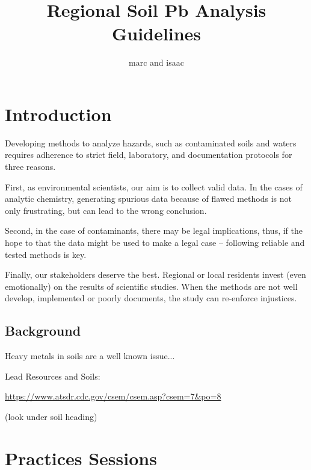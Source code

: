 \documentclass{article}\usepackage[]{graphicx}\usepackage[]{color}
\title{Regional Soil Pb Analysis Guidelines}
\author{marc and isaac}
\begin{document}
\maketitle

\section{Introduction}

Developing methods to analyze hazards, such as contaminated soils and waters requires adherence to strict field, laboratory, and documentation protocols for three reasons. 

First, as environmental scientists, our aim is to collect valid data. In the cases of analytic chemistry, generating spurious data because of flawed methods is not only frustrating, but can lead to the wrong conclusion.

Second, in the case of contaminants, there may be legal implications, thus, if the hope to that the data might be used to make a legal case -- following reliable and tested methods is key. 

Finally, our stakeholders deserve the best. Regional or local residents invest (even emotionally) on the results of scientific studies. When the methods are not well develop, implemented or poorly documents, the study can re-enforce injustices. 

\subsection{Background}

Heavy metals in soils are a well known issue...




Lead Resources and Soils:

\url{https://www.atsdr.cdc.gov/csem/csem.asp?csem=7&po=8}

(look under soil heading) 

\section{Practices Sessions}
\end{document}
